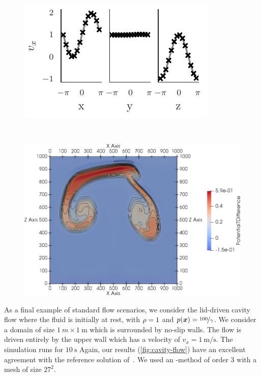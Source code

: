 \documentclass[runningheads]{llncs}
\begin{document}
\begin{figure}[tb]
\centering
\begin{minipage}{.5\textwidth}
  \centering
    \includegraphics{paper_abc_flow_velocity}
\end{minipage}~%
\begin{minipage}{.5\textwidth}
  \centering
    \includegraphics[width=\textwidth]{paper_two_bubbles_fv}
\end{minipage}
\end{figure}

As a final example of standard flow scenarios, we consider the lid-driven cavity flow where the fluid is initially at rest, with $\rho = 1$ and $ p(\bm{x}) = \nicefrac{100}{\gamma}$.
We consider a domain of size $\SI{1}{m} \times \SI{1}{\m}$ which is surrounded by no-slip walls.
The flow is driven entirely by the upper wall which has a velocity of $v_x = \SI{1}{\m/\s}$.
The simulation runs for $\SI{10}{\s}$
Again, our results (\cref{fig:cavity-flow}) have an excellent agreement with the reference solution of~\cite{ghia1982high}.
We used an \aderdg{}-method of order $3$ with a mesh of size $27^2$.
\end{document}
